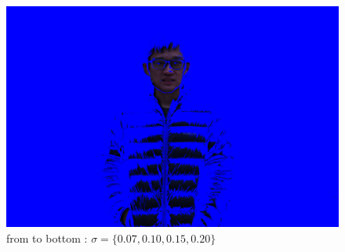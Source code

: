 \documentclass[final]{cvpr}
\begin{document}
\begin{figure}[ht]
   \includegraphics[scale=0.03]{../data/output/arthas_final_nf_1.2_0.20_10_10.JPG}
   \caption{from to bottom : $ \sigma = \{0.07,0.10,0.15,0.20\}$}
\end{figure}
\end{document}
